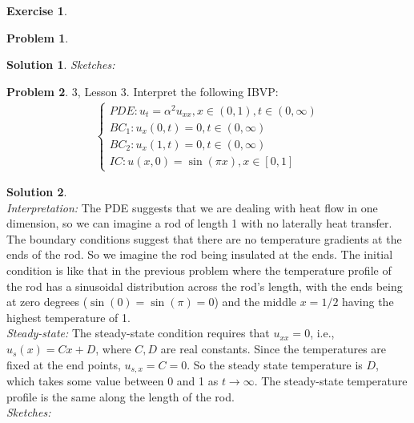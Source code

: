 \documentclass{article}
\theoremstyle{definition}
\newtheorem{sln}{Solution}[section]
\newtheorem*{prob*}{Problem}
\newtheorem{exer}{Exercise}[section]
\begin{document}
\begin{exer}
\begin{prob*}
\begin{sln}
			\textit{Sketches:}
		\end{sln}
	\end{prob*}
	\newpage
	\begin{prob*}3, Lesson 3. Interpret the following IBVP:
		\begin{align*}
		\begin{cases}
		PDE: u_t = \alpha^2 u_{xx}, x\in(0,1), t\in(0,\infty)\\
		BC_1: u_x(0,t) = 0, t\in(0,\infty)\\
		BC_2: u_x(1,t) = 0, t\in(0,\infty)\\
		IC: u(x,0) = \sin(\pi x), x\in[0,1]
		\end{cases}
		\end{align*}
		\begin{sln}
			$\,$\\
			
			\textit{Interpretation:} The PDE suggests that we are dealing with heat flow in one dimension, so we can imagine a rod of length 1 with no laterally heat transfer. The boundary conditions suggest that there are no temperature gradients at the ends of the rod. So we imagine the rod being insulated at the ends. The initial condition is like that in the previous problem where the temperature profile of the rod has a sinusoidal distribution across the rod's length, with the ends being at zero degrees ($\sin(0)=\sin(\pi) = 0$) and the middle $x=1/2$ having the highest temperature of 1. \\
			
			\textit{Steady-state:} The steady-state condition requires that $u_{xx} = 0$, i.e., $u_s(x) = Cx + D$, where $C,D$ are real constants. Since the temperatures are fixed at the end points, $u_{s,x} = C = 0$. So the steady state temperature is $D$, which takes some value between 0 and 1 as $t\to \infty$. The steady-state temperature profile is the same along the length of the rod. \\
			
			\textit{Sketches:}
		\end{sln}
	\end{prob*}
\end{exer}

\newpage
\end{document}
